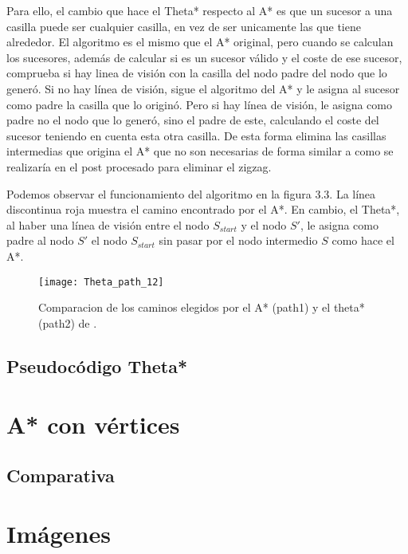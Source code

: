 Para ello, el cambio que hace el Theta* respecto al A* es que un sucesor a una casilla puede ser cualquier casilla, en vez de ser unicamente las que tiene alrededor. El algoritmo es el mismo que el A* original, pero cuando se calculan los sucesores, además de calcular si es un sucesor válido y el coste de ese sucesor, comprueba si hay linea de visión con la casilla del nodo padre del nodo que lo generó. Si no hay línea de visión, sigue el algoritmo del A* y le asigna al sucesor como padre la casilla que lo originó. Pero si hay línea de visión, le asigna como padre no el nodo que lo generó, sino el padre de este, calculando el coste del sucesor teniendo en cuenta esta otra casilla. De esta forma elimina las casillas intermedias que origina el A* que no son necesarias de forma similar a como se realizaría en el post procesado para eliminar el zigzag.

Podemos observar el funcionamiento del algoritmo en la figura 3.3. La línea discontinua roja muestra el camino encontrado por el A*. En cambio, el Theta*, al haber una línea de visión entre el nodo $S_{start}$ y el nodo $S'$, le asigna como padre al nodo $S'$ el nodo $S_{start}$ sin pasar por el nodo intermedio $S$ como hace el A*.

\begin{figure}[htpb]
    \centering
    \texttt{[image: Theta\_path\_12]}
    \caption[Comparacion de los caminos elegidos por el A* y el Theta*]{Comparacion de los caminos elegidos por el A* (path1) y el theta* (path2) de \cite{thetaestrellawebimagen}.}
    \label{fig:basics AFM sketch}
\end{figure}


\subsection{Pseudocódigo Theta*}

\section{A* con vértices}

\subsection{Comparativa}



\section{Imágenes}

